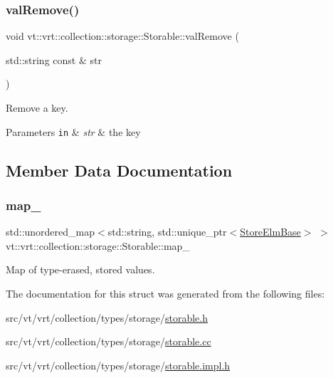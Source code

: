 \subsubsection{\texorpdfstring{val\+Remove()}{valRemove()}}
{\footnotesize\ttfamily void vt\+::vrt\+::collection\+::storage\+::\+Storable\+::val\+Remove (\begin{DoxyParamCaption}\item[{std\+::string const \&}]{str }\end{DoxyParamCaption})}



Remove a key. 


\begin{DoxyParams}[1]{Parameters}
\mbox{\tt in}  & {\em str} & the key \\
\hline
\end{DoxyParams}


\subsection{Member Data Documentation}
\mbox{\label{structvt_1_1vrt_1_1collection_1_1storage_1_1_storable_ade35c0e0ef45b53ffad56cbc349cfb82}} 
\subsubsection{\texorpdfstring{map\+\_\+}{map\_}}
{\footnotesize\ttfamily std\+::unordered\+\_\+map$<$std\+::string, std\+::unique\+\_\+ptr$<$\hyperlink{structvt_1_1vrt_1_1collection_1_1storage_1_1_store_elm_base}{Store\+Elm\+Base}$>$ $>$ vt\+::vrt\+::collection\+::storage\+::\+Storable\+::map\+\_\+\hspace{0.3cm}{\ttfamily [private]}}



Map of type-\/erased, stored values. 



The documentation for this struct was generated from the following files\+:\begin{DoxyCompactItemize}
\item 
src/vt/vrt/collection/types/storage/\hyperlink{storable_8h}{storable.\+h}\item 
src/vt/vrt/collection/types/storage/\hyperlink{storable_8cc}{storable.\+cc}\item 
src/vt/vrt/collection/types/storage/\hyperlink{storable_8impl_8h}{storable.\+impl.\+h}\end{DoxyCompactItemize}
